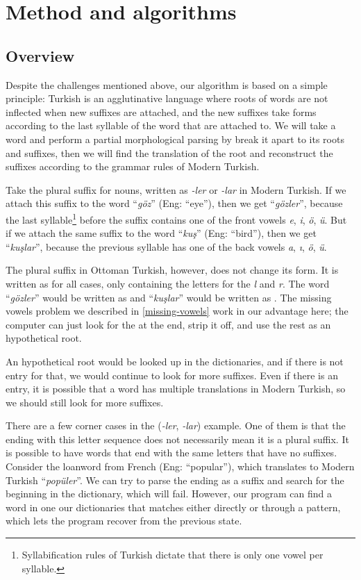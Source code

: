 \documentclass[10pt,twocolumn]{article}
\theoremstyle{nonumberplain}
\newcommand{\otto}[1]{\RLE{\ottoman{}\Large{}#1}}
\newcommand{\word}[1]{``\emph{#1}''}
\begin{document}
\section{Method and algorithms}

\subsection{Overview}

Despite the challenges mentioned above, our algorithm is based on a simple
principle: Turkish is an agglutinative language where roots of words are not
inflected when new suffixes are attached, and the new suffixes take forms
according to the last syllable of the word that are attached to. We will take a
word and perform a partial morphological parsing by break it apart to its roots
and suffixes, then we will find the translation of the root and reconstruct the
suffixes according to the grammar rules of Modern Turkish.

Take the plural suffix for nouns, written as \emph{-ler} or \emph{-lar} in Modern
Turkish. If we attach this suffix to the word \word{göz} (Eng: ``eye''),
then we get \word{gözler}, because the last syllable\footnote{Syllabification
rules of Turkish dictate that there is only one vowel per syllable.} before the
suffix contains one of the front vowels \emph{e}, \emph{i}, \emph{ö}, \emph{ü}.
But if we attach the same suffix to the word \word{kuş} (Eng: ``bird''),
then we get \word{kuşlar}, because the previous syllable has one of the back
vowels \emph{a}, \emph{ı}, \emph{ö}, \emph{ü}.

The plural suffix in Ottoman Turkish, however, does not change its form. It is
written as \otto{-لر} for all cases, only containing the letters for the
\emph{l} and \emph{r}.
The word \word{gözler} would be written as \otto{گوزلر} and \word{kuşlar} would
be written as \otto{قوشلر}.
The missing vowels problem we described in \autoref{missing-vowels} work in our
advantage here; the computer can just look for the \otto{-لر} at the end, strip it off, and
use the rest as an hypothetical root.

An hypothetical root would be looked up in the dictionaries, and if there is
not entry for that, we would continue to look for more suffixes. Even if there
is an entry, it is possible that a word has multiple translations in Modern
Turkish, so we should still look for more suffixes.

There are a few corner cases in the \otto{-لر} (\emph{-ler}, \emph{-lar})
example. One of them is that the ending with this letter sequence does not
necessarily mean it is a plural suffix. It is possible to have words that end
with the same letters that have no suffixes. Consider the loanword from French
\otto{پوپولر} (Eng: ``popular''), which translates to Modern Turkish
\word{popüler}. We can try to parse the ending as a suffix and search for the
beginning in the dictionary, which will fail. However, our program can find a
word in one our dictionaries that matches either directly or through a pattern,
which lets the program recover from the previous state.
\end{document}

